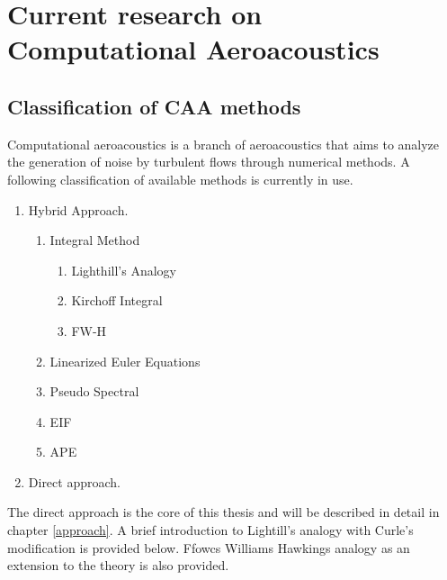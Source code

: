 
\chapter{Current research on Computational Aeroacoustics} %

\label{CAA} %


\section{Classification of CAA methods}
Computational aeroacoustics is a branch of aeroacoustics that aims to analyze the generation of noise by turbulent flows through numerical methods. A following classification of available methods is currently in use.

\begin{enumerate}
   \item Hybrid Approach.
   \begin{enumerate}
     \item Integral Method
     \begin{enumerate}
     	\item Lighthill's Analogy
     	\item Kirchoff Integral
     	\item FW-H
     \end{enumerate}
     \item Linearized Euler Equations
     \item Pseudo Spectral
     \item EIF
     \item APE
   \end{enumerate}
   \item Direct approach.
\end{enumerate}

The direct approach is the core of this thesis and will be described in detail in chapter \ref{approach}. A brief introduction to Lightill's analogy with Curle's modification is provided below. Ffowcs Williams Hawkings analogy as an extension to the theory is also provided.

